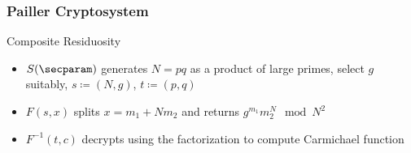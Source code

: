 \documentclass{beamer}
\begin{document}
\begin{frame}
    \frametitle{Pailler Cryptosystem}
    Composite Residuosity
    \begin{itemize}
        \item $S(\secparam)$ generates $N = pq$ as a product of large primes,
              select $g$ suitably, $s \coloneqq (N, g)$, $t \coloneqq (p, q)$
        \item $F(s, x)$ splits $x = m_1 + N m_2$ and returns $g^{m_1} m_2^N \mod N^2$
        \item $F^{-1}(t, c)$ decrypts using the factorization to compute Carmichael function
    \end{itemize}
\end{frame}
\end{document}
